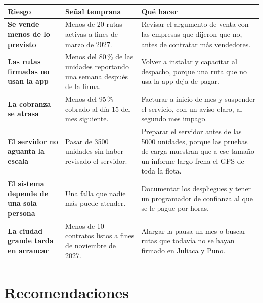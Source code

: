 \documentclass[10.5pt,a4paper]{article}
\begin{document}
{\small
\begin{tabularx}{\linewidth}{@{}>{\bfseries}p{3.4cm}XX@{}}
\toprule
\normalfont Riesgo & Señal temprana & Qué hacer\\
\midrule
Se vende menos de lo previsto & Menos de 20 rutas activas a fines de marzo de 2027. & Revisar el argumento de venta con las empresas que dijeron que no, antes de contratar más vendedores.\\
Las rutas firmadas no usan la app & Menos del 80\,\% de las unidades reportando una semana después de la firma. & Volver a instalar y capacitar al despacho, porque una ruta que no usa la app deja de pagar.\\
La cobranza se atrasa & Menos del 95\,\% cobrado al día 15 del mes siguiente. & Facturar a inicio de mes y suspender el servicio, con un aviso claro, al segundo mes impago.\\
El servidor no aguanta la escala & Pasar de 3500 unidades sin haber revisado el servidor. & Preparar el servidor antes de las 5000 unidades, porque las pruebas de carga muestran que a ese tamaño un informe largo frena el GPS de toda la flota.\\
El sistema depende de una sola persona & Una falla que nadie más puede atender. & Documentar los despliegues y tener un programador de confianza al que se le pague por horas.\\
La ciudad grande tarda en arrancar & Menos de 10 contratos listos a fines de noviembre de 2027. & Alargar la pausa un mes o buscar rutas que todavía no se hayan firmado en Juliaca y Puno.\\
\bottomrule
\end{tabularx}}

\section{Recomendaciones}
\end{document}

